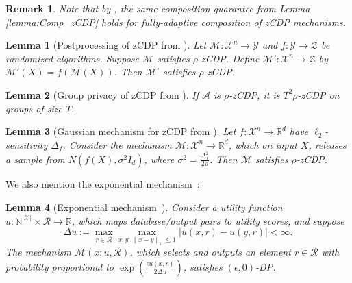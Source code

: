 \documentclass{article}
\newtheorem{remark}{Remark}
\newtheorem{lemma}{Lemma}
\newcommand{\real}{\mathbb{R}}
\begin{document}
\begin{remark}
Note that by \cite{whitehouse2023fully}, the same composition guarantee from Lemma \ref{lemma:Comp_zCDP} holds for fully-adaptive composition of zCDP mechanisms.
\end{remark}

\begin{lemma}[Postprocessing of zCDP from \cite{bun2016conc}]
Let $\mathcal{M} : \mathcal{X}^n \rightarrow \mathcal{Y}$ and $f : \mathcal{Y} \rightarrow \mathcal{Z}$ be randomized algorithms. Suppose $\mathcal{M}$ satisfies $\rho$-zCDP. Define $\mathcal{M}' : \mathcal{X}^n \rightarrow \mathcal{Z}$ by $\mathcal{M}'(X) = f(\mathcal{M}(X))$. Then $\mathcal{M}'$ satisfies $\rho$-zCDP.
\end{lemma}

\begin{lemma}[Group privacy of zCDP from \cite{bun2016conc}]
\label{LemGroupZ}
\label{lemma:Group_zCDP}
If $\mathcal{A}$ is $\rho$-zCDP, it is $T^2\rho$-zCDP on groups of size $T$. 
\end{lemma} 

\begin{lemma}[Gaussian mechanism for zCDP from \cite{bun2016conc}]
\label{lemma:Gauss_zCDP}
Let $f : \mathcal{X}^n \rightarrow \mathbb{R}^d$ have $\ell_2$-sensitivity $\Delta_f$. Consider the mechanism $\mathcal{M} : \mathcal{X}^n \rightarrow \mathbb{R}^d$, which on input $X$, releases a sample from $N(f(X), \sigma^2I_d)$, where $\sigma^2 = \frac{\Delta_f^2}{2\rho}$. Then $\mathcal{M}$ satisfies $\rho$-zCDP.
\end{lemma}

We also mention the exponential mechanism~\cite{mcsherry2007mechanism}:

\begin{lemma}[Exponential mechanism~\cite{DwoRot14}]
\label{LemExponential}
Consider a utility function $u: \mathbb{N}^{|\mathcal{X}|} \times \mathcal{R} \rightarrow \real$, which maps database/output pairs to utility scores, and suppose
\begin{equation*}
\Delta u := \max_{r \in \mathcal{R}} \max_{x,y: \|x-y\|_1 \le 1} |u(x,r) - u(y,r)| < \infty.
\end{equation*}
The mechanism $\mathcal{M}(x; u, \mathcal{R})$, which selects and outputs an element $r \in \mathcal{R}$ with probability proportional to $\exp\left(\frac{\epsilon u(x,r)}{2\Delta u}\right)$, satisfies $(\epsilon, 0)$-DP.
\end{lemma}
\end{document}
